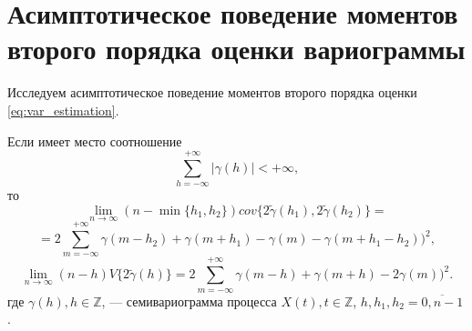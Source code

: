 \vspace{1em}

\section{Асимптотическое поведение моментов второго порядка оценки вариограммы} %
\label{sec:new_section}

Исследуем асимптотическое поведение моментов второго порядка оценки \eqref{eq:var_estimation}.

\begin{Theorem}
	Если имеет место соотношение
	\begin{equation}
	\label{eq:var_abs}
		\sum_{h = -\infty}^{+\infty} \vert \gamma(h) \vert < +\infty,
	\end{equation}
	то
	\begin{equation*}
		\lim_{n \to \infty} (n - \min\{ h_1, h_2 \}) cov\{ 2 \tilde{\gamma}(h_1), 2 \tilde{\gamma}(h_2) \} = %
	\end{equation*}
	\begin{equation}
	\label{eq:asymptotic_cov}
		= 2 \sum_{m = -\infty}^{+\infty} \gamma(m - h_2) + \gamma(m + h_1) - \gamma(m) - \gamma(m + h_1 - h_2))^2,
	\end{equation}
	\begin{equation}
	\label{eq:asymptotic_var}
		\lim_{n \to \infty} (n - h) V\{ 2 \tilde{\gamma}(h) \} = 2 \sum_{m = -\infty}^{+\infty} \gamma(m - h) + \gamma(m + h) - 2 \gamma(m))^2.
	\end{equation}
	где $ \gamma(h), h \in \mathbb{Z} $, --- семивариограмма процесса $ X(t), t \in \mathbb{Z}$, $ h, h_1, h_2 = \overline{0, n - 1} $.
\end{Theorem}
